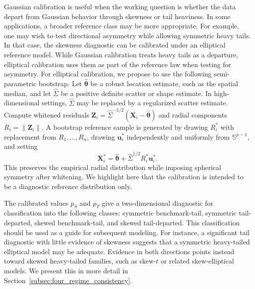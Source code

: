 \documentclass[11pt]{article}
\theoremstyle{plain}
\theoremstyle{definition}
\theoremstyle{remark}
\def\X{\bm{X}}
\def\u{\bm{u}}
\newcommand{\boldtheta}{\bm{\theta}}
\newcommand{\norm}[1]{\left\| #1 \right\|}
\newcommand{\sd}[1]{{\color{red}(SD: #1)}}
\begin{document}
Gaussian calibration is useful when the working question is whether the data depart from Gaussian behavior through skewness or tail heaviness. In some applications, a broader reference class may be more appropriate. For example, one may wish to test directional asymmetry while allowing symmetric heavy tails. In that case, the skewness diagnostic can be calibrated under an elliptical reference model. While Gaussian calibration treats heavy tails as a departure, elliptical calibration uses them as part of the reference law when testing for asymmetry. For elliptical calibration, we propose to use the following semi-parametric bootstrap. Let \(\widehat{\boldtheta}\) be a robust location estimate, such as the spatial median, and let \(\widehat\Sigma\) be a positive definite scatter or shape estimate. In high-dimensional settings, \(\widehat\Sigma\) may be replaced by a regularized scatter estimate. Compute whitened residuals \(\bm{Z}_i=\widehat\Sigma^{-1/2}(\X_i-\widehat{\boldtheta})\) and radial components \(R_i=\norm{\bm{Z}_i}\). A bootstrap reference sample is generated by drawing \(R_i^\ast\) with replacement from \(R_1,\ldots,R_n\), drawing \(\u_i^\ast\) independently and uniformly from \(\mathbb{S}^{p-1}\), and setting
\[
\X_i^\ast=\widehat{\boldtheta}+\widehat\Sigma^{1/2}R_i^\ast \u_i^\ast .
\]
This preserves the empirical radial distribution while imposing spherical symmetry after whitening. We highlight here that the calibration is intended to be a diagnostic reference distribution only.


The calibrated values \(p_S\) and \(p_T\) give a two-dimensional diagnostic for classification into the following classes: symmetric benchmark-tail, symmetric tail-departed, skewed benchmark-tail, and skewed tail-departed. This classification should be used as a guide for subsequent modeling. For instance, a significant tail diagnostic with little evidence of skewness suggests that a symmetric heavy-tailed elliptical model may be adequate. Evidence in both directions points instead toward skewed heavy-tailed families, such as skew-\(t\) or related skew-elliptical models. We present this in more detail in Section~\ref{subsec:four_regime_consistency}.

\end{document}
